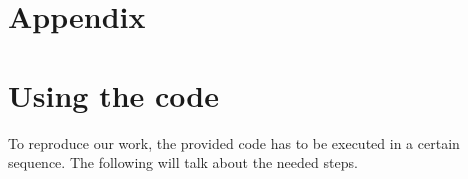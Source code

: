 \documentclass[10pt,a4paper]{article}
\begin{document}
	
	\appendix
	
	\section*{Appendix}
			
	\section{Using the code}
		To reproduce our work, the provided code has to be executed in a certain sequence. The following will talk about the needed steps.

	\newpage
	
		
	
	
\end{document}
